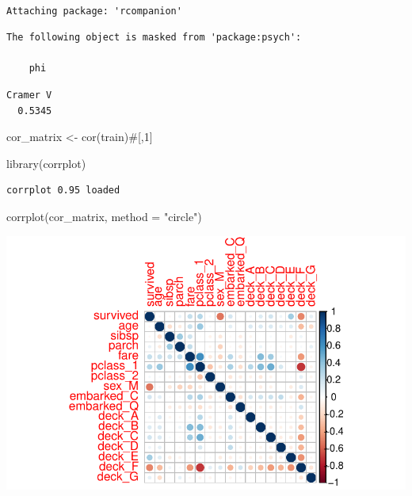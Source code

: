 \documentclass[
  letterpaper,
  DIV=11,
  numbers=noendperiod]{scrartcl}
\newenvironment{Shaded}{\begin{snugshade}}{\end{snugshade}}
\newcommand{\AttributeTok}[1]{\textcolor[rgb]{0.40,0.45,0.13}{#1}}
\newcommand{\CommentTok}[1]{\textcolor[rgb]{0.37,0.37,0.37}{#1}}
\newcommand{\FunctionTok}[1]{\textcolor[rgb]{0.28,0.35,0.67}{#1}}
\newcommand{\NormalTok}[1]{\textcolor[rgb]{0.00,0.23,0.31}{#1}}
\newcommand{\OtherTok}[1]{\textcolor[rgb]{0.00,0.23,0.31}{#1}}
\newcommand{\SpecialCharTok}[1]{\textcolor[rgb]{0.37,0.37,0.37}{#1}}
\newcommand{\StringTok}[1]{\textcolor[rgb]{0.13,0.47,0.30}{#1}}
\begin{document}
\begin{verbatim}

Attaching package: 'rcompanion'
\end{verbatim}

\begin{verbatim}
The following object is masked from 'package:psych':

    phi
\end{verbatim}

\begin{Shaded}
\end{Shaded}

\begin{verbatim}
Cramer V 
  0.5345 
\end{verbatim}

\begin{Shaded}
\begin{Highlighting}[]
\NormalTok{cor\_matrix }\OtherTok{\textless{}{-}} \FunctionTok{cor}\NormalTok{(train)}\CommentTok{\#[,1]}

\FunctionTok{library}\NormalTok{(corrplot)}
\end{Highlighting}
\end{Shaded}

\begin{verbatim}
corrplot 0.95 loaded
\end{verbatim}

\begin{Shaded}
\begin{Highlighting}[]
\FunctionTok{corrplot}\NormalTok{(cor\_matrix, }\AttributeTok{method =} \StringTok{"circle"}\NormalTok{)}
\end{Highlighting}
\end{Shaded}

\includegraphics{FinalProject_files/figure-pdf/unnamed-chunk-10-6.pdf}
\end{document}
